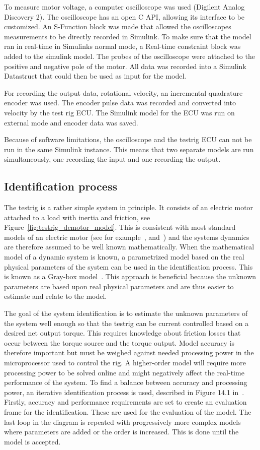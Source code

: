 To measure motor voltage, a computer oscilloscope was used (Digilent Analog
Discovery 2). The oscilloscope has an open C API, allowing its interface to be
customized. An S-Function block was made that allowed the oscilloscopes
measurements to be directly recorded in Simulink. To make sure that the model
ran in real-time in Simulinks normal mode, a Real-time constraint block was
added to the simulink model. The probes of the oscilloscope were attached to
the positive and negative pole of the motor. All data was recorded into a
Simulink Datastruct that could then be used as input for the model. 

For recording the output data, rotational velocity, an incremental quadrature
encoder was used. The encoder pulse data was recorded and converted into
velocity by the test rig ECU\@. The Simulink model for the ECU was run on external
mode and encoder data was saved. 

Because of software limitations, the oscilloscope and the testrig ECU can not be
run in the same Simulink instance. This means that two separate models are run
simultaneously, one recording the input and one recording the output.

\subsection{Identification process}
The testrig is a rather simple system in principle. It consists of an electric
motor attached to a load with inertia and friction, see
Figure~\ref{fig:testrig_dcmotor_model}.  This is consistent with most standard
models of an electric motor (see for example~\cite{beloiu2014},
\cite{reglerteknik2006} and~\cite{modeling1994}) and the systems dynamics are
therefore assumed to be well known mathematically. When the mathematical model
of a dynamic system is known, a parametrized model based on the real
physical parameters of the system can be used in the identification process.
This is known as a Gray-box model~\cite{modeling1994}. This approach is
beneficial because the unknown parameters are based upon real physical
parameters and are thus easier to estimate and relate to the model. 

The goal of the system identification is to estimate the unknown parameters of the
system well enough so that the testrig can be current controlled based on a 
desired net output torque. This requires knowledge about friction losses that
occur between the torque source and the torque output. Model accuracy is therefore
important but must be weighed against needed processing power in the microprocessor
used to control the rig. A higher-order model will require more processing power
to be solved online and might negatively affect the real-time performance of the
system. To find a balance between accuracy and processing power, an iterative
identification process is used, described in Figure 14.1 in~\cite{modeling1994}. 
Firstly, accuracy and performance requirements are set to create an evaluation
frame for the identification. These are used for the evaluation of the model. 
The last loop in the diagram is repeated with progressively more complex models
where parameters are added or the order is increased. This is done until the
model is accepted.

